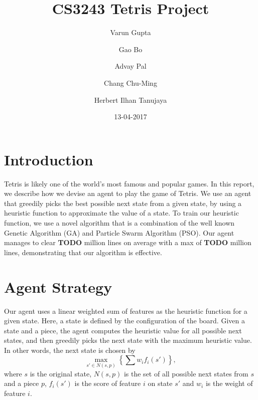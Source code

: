 \documentclass[12pt]{article}
\title{CS3243 Tetris Project}
\author{Varun Gupta \and Gao Bo \and Advay Pal \and Chang Chu-Ming \and Herbert Ilhan Tanujaya}
\date{13-04-2017}
\begin{document}
	\vspace{-4cm}
	\maketitle
	\thispagestyle{empty}
	\vspace{-1cm}

    \section{Introduction}
    Tetris is likely one of the world's most famous and popular games.
    In this report, we describe how we devise an agent to play the game of Tetris.
    We use an agent that greedily picks the best possible next state from a given state,
    by using a heuristic function to approximate the value of a state. To train our heuristic
    function, we use a novel algorithm that is a combination of the well known Genetic Algorithm (GA)
    and Particle Swarm Algorithm (PSO). Our agent manages to clear \textbf{TODO} million lines on average with a max
    of \textbf{TODO} million lines, demonstrating that our algorithm is effective.

    \section{Agent Strategy}
	Our agent uses a linear weighted sum of features as the heuristic function for
	a given state. Here, a state is defined by the configuration of the board. Given a
	state and a piece, the agent computes the heuristic value for all possible next
	states, and then greedily picks the next state with the maximum heuristic
	value. In other words, the next state is chosen by \[ \max_{s' \in N(s, p)}
	\left\{ \sum w_i f_i(s') \right\}, \] where $s$ is the original state, $N(s,
	p)$ is the set of all possible next states from $s$ and a piece $p$, $f_i(s')$
	is the score of feature $i$ on state $s'$ and $w_i$ is the weight of feature
	$i$.
\end{document}
